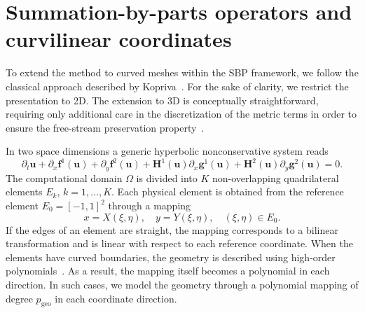 \documentclass[]{scrartcl}
\renewcommand{\vec}[1]{\boldsymbol{#1}}
\theoremstyle{definition}
\begin{document}
\section{Summation-by-parts operators and curvilinear coordinates}
\label{sec:sbp_curvilinear}
To extend the method to curved meshes within the SBP framework, we follow the classical approach described by Kopriva~\cite{Kopriva2006,Kopriva2009}.
For the sake of clarity, we restrict the presentation to 2D.
The extension to 3D is conceptually straightforward, requiring only additional care in the discretization of the metric terms in order to ensure the free-stream preservation property~\cite{vinokur2002extension, Kopriva2006, Kopriva2009}.

In two space dimensions a generic hyperbolic nonconservative system reads
\begin{equation}
\partial_t \vec{u} + \partial_x \vec{f}^1(\vec{u}) + \partial_y \vec{f}^2(\vec{u}) + \vec{H}^1(\vec{u}) \partial_x \vec{g}^1(\vec{u}) + \vec{H}^2(\vec{u}) \partial_y \vec{g}^2(\vec{u}) = 0.
\end{equation}
The computational domain $\Omega$ is divided into $K$ non-overlapping quadrilateral elements $E_k$, $k = 1, \dots, K$.
Each physical element is obtained from the reference element $E_0 = [-1,1]^2$ through a mapping
\begin{equation}
x = X(\xi, \eta), \quad y = Y(\xi, \eta), \quad (\xi, \eta) \in E_0.
\end{equation}
If the edges of an element are straight, the mapping corresponds to a bilinear transformation and is linear with respect to each reference coordinate.
When the elements have curved boundaries, the geometry is described using high-order polynomials~\cite{Kopriva2006, Kopriva2009}.
As a result, the mapping itself becomes a polynomial in each direction.
In such cases, we model the geometry through a polynomial mapping of degree $p_{\mathrm{geo}}$ in each coordinate direction.
\end{document}
